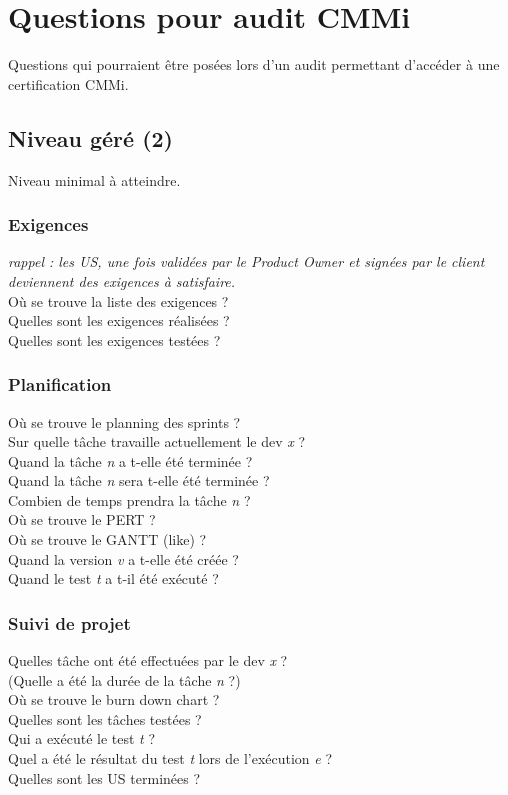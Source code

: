 \chapter{Questions pour audit CMMi}
Questions qui pourraient \^etre pos\'ees lors d'un audit permettant d'acc\'eder \`a une certification CMMi.
\section{Niveau g\'er\'e (2)}
Niveau minimal \`a atteindre.
\subsection{Exigences}
\noindent \textit{rappel : les US, une fois valid\'ees par le Product Owner et sign\'ees par le client deviennent des exigences \`a satisfaire.}\\
O\`u se trouve la liste des exigences ?\\
Quelles sont les exigences r\'ealis\'ees ?\\
Quelles sont les exigences test\'ees ?
\subsection{Planification}
\noindent O\`u se trouve le planning des sprints ?\\
Sur quelle t\^ache travaille actuellement le dev \textit{x} ?\\
Quand la t\^ache \textit{n} a t-elle \'et\'e termin\'ee ?\\
Quand la t\^ache \textit{n} sera t-elle \'et\'e termin\'ee ?\\
Combien de temps prendra la t\^ache \textit{n} ?\\
O\`u se trouve le PERT ?\\
O\`u se trouve le GANTT (like) ?\\
Quand la version \textit{v} a t-elle \'et\'e cr\'e\'ee ?\\
Quand le test \textit{t} a t-il \'et\'e ex\'ecut\'e ?\\
\subsection{Suivi de projet}
\noindent Quelles t\^ache ont \'et\'e effectu\'ees par le dev \textit{x} ?\\
(Quelle a \'et\'e la dur\'ee de la t\^ache \textit{n} ?)\\
O\`u se trouve le burn down chart ?\\
Quelles sont les t\^aches test\'ees ?\\
Qui a ex\'ecut\'e le test \textit{t} ?\\
Quel a \'et\'e le r\'esultat du test \textit{t} lors de l'ex\'ecution \textit{e} ?\\
Quelles sont les US termin\'ees ?
